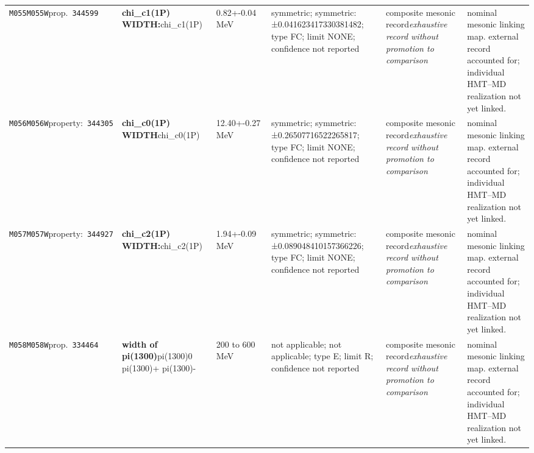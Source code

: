 \begin{landscape}
\begin{longtable}{L{1.85cm}L{4.45cm}L{2.35cm}L{4.05cm}L{3.35cm}L{7.15cm}}
\texttt{M055}\newline \texttt{M055W}\newline prop.\ \texttt{344599} & \textbf{chi\_\allowbreak{}c1(1P) WIDTH:}\newline chi\_\allowbreak{}c1(1P) & 0.82+-0.04\,MeV & symmetric; symmetric: ±0.041623417330381482; type FC; limit NONE; confidence not reported & composite mesonic record\newline \emph{exhaustive record without promotion to comparison} & nominal mesonic linking map. external record accounted for; individual HMT--MD realization not yet linked. \\
\texttt{M056}\newline \texttt{M056W}\newline property:\ \texttt{344305} & \textbf{chi\_\allowbreak{}c0(1P) WIDTH}\newline chi\_\allowbreak{}c0(1P) & 12.40+-0.27\,MeV & symmetric; symmetric: ±0.26507716522265817; type FC; limit NONE; confidence not reported & composite mesonic record\newline \emph{exhaustive record without promotion to comparison} & nominal mesonic linking map. external record accounted for; individual HMT--MD realization not yet linked. \\
\texttt{M057}\newline \texttt{M057W}\newline property:\ \texttt{344927} & \textbf{chi\_\allowbreak{}c2(1P) WIDTH:}\newline chi\_\allowbreak{}c2(1P) & 1.94+-0.09\,MeV & symmetric; symmetric: ±0.089048410157366226; type FC; limit NONE; confidence not reported & composite mesonic record\newline \emph{exhaustive record without promotion to comparison} & nominal mesonic linking map. external record accounted for; individual HMT--MD realization not yet linked. \\
\texttt{M058}\newline \texttt{M058W}\newline prop.\ \texttt{334464} & \textbf{width of pi(1300)}\newline pi(1300)0 \textbar{}\allowbreak{} pi(1300)+ \textbar{}\allowbreak{} pi(1300)- & 200 to 600\,MeV & not applicable; not applicable; type E; limit R; confidence not reported & composite mesonic record\newline \emph{exhaustive record without promotion to comparison} & nominal mesonic linking map. external record accounted for; individual HMT--MD realization not yet linked. \\

\end{longtable}
\end{landscape}
